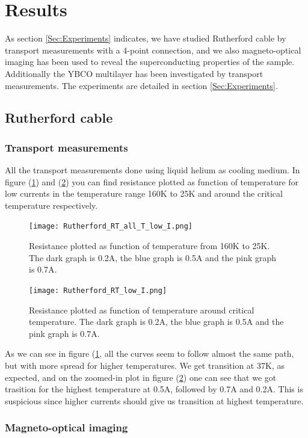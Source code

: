 \documentclass{comjnl}
\begin{document}
\section{Results}\label{Sec:Results}
As section \ref{Sec:Experiments} indicates, we have studied Rutherford cable by transport measurements with a 4-point connection, and we also magneto-optical imaging has been used to reveal the superconducting properties of the sample. Additionally the YBCO multilayer has been investigated by transport measurements. The experiments are detailed in section \ref{Sec:Experiments}.

\subsection{Rutherford cable}
\subsubsection{Transport measurements}
All the transport measurements done using liquid helium as cooling medium. In figure (\ref{fig:rutherfordRTallI}) and (\ref{fig:rutherfordRTlowI}) you can find resistance plotted as function of temperature for low currents in the temperature range 160K to 25K and around the critical temperature respectively. 
\begin{figure}[H]
\centering
\texttt{[image: Rutherford\_RT\_all\_T\_low\_I.png]}
\caption{Resistance plotted as function of temperature from 160K to 25K. The dark graph is 0.2A, the blue graph is 0.5A and the pink graph is 0.7A. \label{fig:rutherfordRTallI}}
\end{figure}
\begin{figure}[H]
\centering
\texttt{[image: Rutherford\_RT\_low\_I.png]}
\caption{Resistance plotted as function of temperature around critical temperature. The dark graph is 0.2A, the blue graph is 0.5A and the pink graph is 0.7A. \label{fig:rutherfordRTlowI}}
\end{figure}
As we can see in figure (\ref{fig:rutherfordRTallI}, all the curves seem to follow almost the same path, but with more spread for higher temperatures. We get transition at 37K, as expected, and on the zoomed-in plot in figure (\ref{fig:rutherfordRTlowI}) one can see that we got trasition for the highest temperature at 0.5A, followed by 0.7A and 0.2A. This is suspicious since higher currents should give us transition at highest temperature. 

\subsubsection{Magneto-optical imaging}
\end{document}
